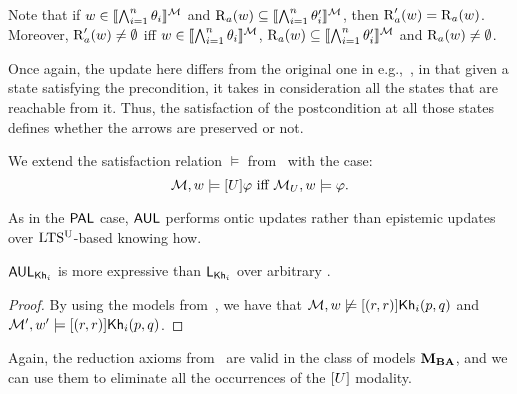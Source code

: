 \medskip 

Note that if $w \in \llbracket \bigwedge_{i=1}^n \theta_i \rrbracket^{\mathcal{M}}$ and $\operatorname{R}_a(w) \subseteq \llbracket \bigwedge_{i=1}^n \theta'_i \rrbracket^{\mathcal{M}}$, then $\operatorname{R}'_a(w) = \operatorname{R}_a(w)$.
Moreover, $\operatorname{R}'_a(w) \neq \emptyset$ iff $w \in \llbracket \bigwedge_{i=1}^n \theta_i \rrbracket^{\mathcal{M}}$, $\operatorname{R}_a(w) \subseteq \llbracket \bigwedge_{i=1}^n \theta'_i \rrbracket^{\mathcal{M}}$ and $\operatorname{R}_a(w) \neq \emptyset$.

Once again, the update here differs from the original one in e.g.,~\cite{KooiR11}, in that given a state satisfying the precondition, it takes in consideration all the states that are reachable from it. Thus, the satisfaction of the postcondition at all those states defines whether the arrows are preserved or not.

\medskip 

\begin{definition}\label{def:arrowupdate}
We extend the satisfaction relation $\models$ from~ with the case:
\[
	\mathcal{M},w \models [U]\varphi \mbox{ iff } \mathcal{M}_{{U}},w \models \varphi.
\]
\end{definition}

\medskip 

As in the $\textsf{PAL}$ case, $\mathsf{AUL}$ performs ontic updates rather than epistemic updates over $\textup{LTS$^\text{\textup{U}}$}$-based knowing how.

\medskip 

\begin{proposition}\label{prop:expaul}
$\mathsf{AUL}_{{\sf Kh}_i}$ is more expressive than $\mathsf{L}_{{\sf Kh}_i}$ over arbitrary \ultss.
\end{proposition}
\begin{proof}
By using the models from~, we have that $\mathcal{M},w \not\models [(r,r)]{\sf Kh}_i(p,q)$ and $\mathcal{M}',w' \models[(r,r)]{\sf Kh}_i(p,q)$.
\end{proof}

Again, the reduction axioms from~ are valid in the class of models $\mathbf{M}_{\mathbf{BA}}$, and we can use them to eliminate all the occurrences of the $[U]$ modality. %


